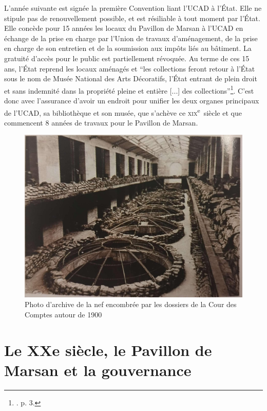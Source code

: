 L'année suivante est signée la première Convention liant l'UCAD à l'État. Elle ne stipule pas de renouvellement possible, et est résiliable à tout moment par l'État. Elle concède pour 15 années les locaux du Pavillon de Marsan à l'UCAD en échange de la prise en charge par l'Union de travaux d'aménagement, de la prise en charge de son entretien et de la soumission aux impôts liés au bâtiment. La gratuité d'accès pour le public est partiellement révoquée. Au terme de ces 15 ans, l'État reprend les locaux aménagés et \enquote{les collections feront retour à l'État sous le nom de Musée National des Arts Décoratifs, l'État entrant de plein droit et sans indemnité dans la propriété pleine et entière [...] des collections}\footnote{\cite{noauthor__1970}. p. 3.}. C'est donc avec l'assurance d'avoir un endroit pour unifier les deux organes principaux de l'UCAD, sa bibliothèque et son musée, que s'achève ce \textsc{xix}\textsuperscript{e}~siècle et que commencent 8 années de travaux pour le Pavillon de Marsan.

\begin{figure}
    \centering
    \includegraphics[width=0.75\linewidth]{Illustrations/1.jpg}
    \caption{Photo d'archive de la nef encombrée par les dossiers de la Cour des Comptes autour de 1900}
    \label{fig:placeholder}
\end{figure}


\chapter{Le XXe siècle, le Pavillon de Marsan et la gouvernance}

